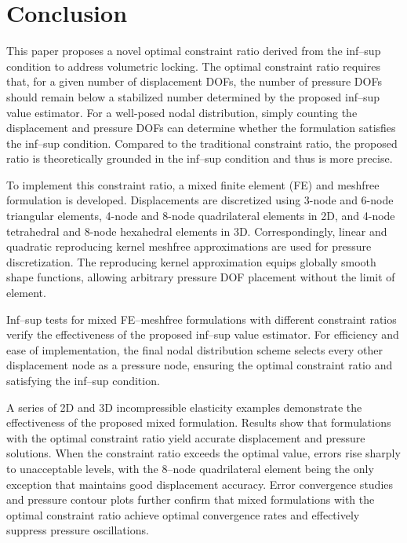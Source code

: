 \section{Conclusion}

This paper proposes a novel optimal constraint ratio derived from the inf--sup condition to address volumetric locking. The optimal constraint ratio requires that, for a given number of displacement DOFs, the number of pressure DOFs should remain below a stabilized number determined by the proposed inf--sup value estimator. For a well-posed nodal distribution, simply counting the displacement and pressure DOFs can determine whether the formulation satisfies the inf--sup condition. Compared to the traditional constraint ratio, the proposed ratio is theoretically grounded in the inf--sup condition and thus is more precise.

To implement this constraint ratio, a mixed finite element (FE) and meshfree formulation is developed. Displacements are discretized using 3-node and 6-node triangular elements, 4-node and 8-node quadrilateral elements in 2D, and 4-node tetrahedral and 8-node hexahedral elements in 3D. Correspondingly, linear and quadratic reproducing kernel meshfree approximations are used for pressure discretization. The reproducing kernel approximation equips globally smooth shape functions, allowing arbitrary pressure DOF placement without the limit of element.

Inf--sup tests for mixed FE--meshfree formulations with different constraint ratios verify the effectiveness of the proposed inf--sup value estimator. For efficiency and ease of implementation, the final nodal distribution scheme selects every other displacement node as a pressure node, ensuring the optimal constraint ratio and satisfying the inf--sup condition.

A series of 2D and 3D incompressible elasticity examples demonstrate the effectiveness of the proposed mixed formulation. Results show that formulations with the optimal constraint ratio yield accurate displacement and pressure solutions. When the constraint ratio exceeds the optimal value, errors rise sharply to unacceptable levels, with the 8--node quadrilateral element being the only exception that maintains good displacement accuracy. Error convergence studies and pressure contour plots further confirm that mixed formulations with the optimal constraint ratio achieve optimal convergence rates and effectively suppress pressure oscillations.
